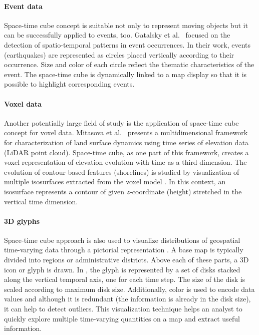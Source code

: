\documentclass[a4paper,12pt,oneside]{book}
\begin{document}



\paragraph{Event data}
Space-time cube concept is suitable not only to represent moving objects
but it can be successfully applied to events, too.
Gatalsky et al.\ \cite{gatalsky2004interactive}
focused on the detection of spatio-temporal patterns in event occurrences.
In their work, events (earthquakes) are represented as circles placed vertically according to their occurrence.
Size and color of each circle reflect the thematic characteristics of the event.
The space-time cube is dynamically linked to a map display so that it is possible to highlight corresponding events.

\paragraph{Voxel data}
\label{voxelHelena}
Another potentially large field of study is the application of space-time cube concept for voxel data.
Mitasova et al.\ \cite{mitasova2011landscape} presents a multidimensional framework for characterization
of land surface dynamics using time series of elevation data (LiDAR point cloud).
Space-time cube, as one part of this framework,
creates a voxel representation of elevation evolution with time as a third dimension.
The evolution of contour-based features (shorelines) is studied
by visualization of multiple isosurfaces extracted from the voxel model%
.
In this context, an isosurface represents a contour of given $z$-coordinate (height)
stretched in the vertical time dimension.

\paragraph{3D glyphs}
Space-time cube approach is also used to visualize distributions of
geospatial time-varying data through a pictorial representation \cite{tominski20053d,thakur20103d}.
A base map is typically divided into regions or administrative districts.
Above each of these parts, a 3D icon or glyph is drawn.
In \cite{thakur20103d}, the glyph is represented by a set of disks stacked along the vertical temporal axis,
one for each time step. The size of the disk is scaled according to maximum disk size.
Additionally, color is used to encode data values and although it is redundant
(the information is already in the disk size), it can help to detect outliers.
This visualization technique helps an analyst to quickly explore multiple time-varying
quantities on a map and extract useful information.
\end{document}
